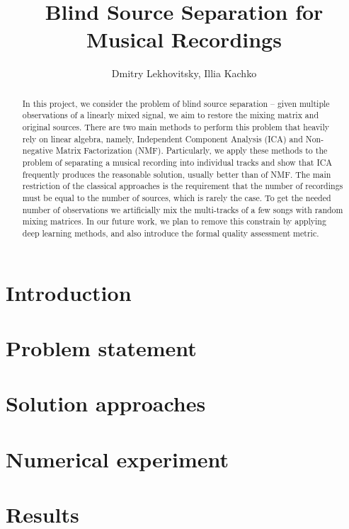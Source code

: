 \documentclass[a4paper,12pt]{article}
\title{ Blind Source Separation for Musical Recordings }
\author{ Dmitry Lekhovitsky, Illia Kachko }
\date{ }
\begin{document}
\maketitle

\begin{abstract}
	In this project, we consider the problem of blind source separation -- given multiple observations of a linearly mixed signal, we aim to restore the mixing matrix and original sources.
	There are two main methods to perform this problem that heavily rely on linear algebra, namely, Independent Component Analysis (ICA) and Non-negative Matrix Factorization (NMF).
	Particularly, we apply these methods to the problem of separating a musical recording into individual tracks and show that ICA frequently produces the reasonable solution, usually better than of NMF.
	The main restriction of the classical approaches is the requirement that the number of recordings must be equal to the number of sources, which is rarely the case. 
	To get the needed number of observations we artificially mix the multi-tracks of a few songs with random mixing matrices.
	In our future work, we plan to remove this constrain by applying deep learning methods, and also introduce the formal quality assessment metric.
\end{abstract}


\section{Introduction}


\section{Problem statement}


\section{Solution approaches}


\section{Numerical experiment}


\section{Results}

\end{document}
